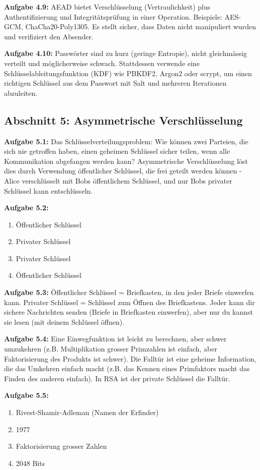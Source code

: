 \documentclass[11pt,a4paper]{report}
\begin{document}
\textbf{Aufgabe 4.9:}
AEAD bietet Verschlüsselung (Vertraulichkeit) plus Authentifizierung und Integritätsprüfung in einer Operation. Beispiele: AES-GCM, ChaCha20-Poly1305. Es stellt sicher, dass Daten nicht manipuliert wurden und verifiziert den Absender.

\textbf{Aufgabe 4.10:}
Passwörter sind zu kurz (geringe Entropie), nicht gleichmässig verteilt und möglicherweise schwach. Stattdessen verwende eine Schlüsselableitungsfunktion (KDF) wie PBKDF2, Argon2 oder scrypt, um einen richtigen Schlüssel aus dem Passwort mit Salt und mehreren Iterationen abzuleiten.

\subsection*{Abschnitt 5: Asymmetrische Verschlüsselung}

\textbf{Aufgabe 5.1:}
Das Schlüsselverteilungsproblem: Wie können zwei Parteien, die sich nie getroffen haben, einen geheimen Schlüssel sicher teilen, wenn alle Kommunikation abgefangen werden kann? Asymmetrische Verschlüsselung löst dies durch Verwendung öffentlicher Schlüssel, die frei geteilt werden können - Alice verschlüsselt mit Bobs öffentlichem Schlüssel, und nur Bobs privater Schlüssel kann entschlüsseln.

\textbf{Aufgabe 5.2:}
\begin{enumerate}[label=\alph*)]
    \item Öffentlicher Schlüssel
    \item Privater Schlüssel
    \item Privater Schlüssel
    \item Öffentlicher Schlüssel
\end{enumerate}

\textbf{Aufgabe 5.3:}
Öffentlicher Schlüssel = Briefkasten, in den jeder Briefe einwerfen kann. Privater Schlüssel = Schlüssel zum Öffnen des Briefkastens. Jeder kann dir sichere Nachrichten senden (Briefe in Briefkasten einwerfen), aber nur du kannst sie lesen (mit deinem Schlüssel öffnen).

\textbf{Aufgabe 5.4:}
Eine Einwegfunktion ist leicht zu berechnen, aber schwer umzukehren (z.B. Multiplikation grosser Primzahlen ist einfach, aber Faktorisierung des Produkts ist schwer). Die Falltür ist eine geheime Information, die das Umkehren einfach macht (z.B. das Kennen eines Primfaktors macht das Finden des anderen einfach). In RSA ist der private Schlüssel die Falltür.

\textbf{Aufgabe 5.5:}
\begin{enumerate}[label=\alph*)]
    \item Rivest-Shamir-Adleman (Namen der Erfinder)
    \item 1977
    \item Faktorisierung grosser Zahlen
    \item 2048 Bits
\end{enumerate}
\end{document}

